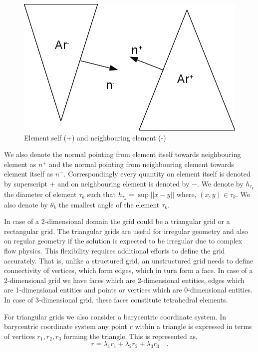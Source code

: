 \documentclass[a4paper]{book}
\begin{document}
\begin{figure}
\centering
  \includegraphics[width=\linewidth]{ch_3_fig_1.jpg}
  \caption{Element self (+) and neighbouring element (-)}
  \label{fig:Self_neighbour}
\end{figure}

We also denote the normal pointing from element itself towards neighbouring element as $n^+$ and the normal pointing from neighbouring element towards element itself as $n^-$. Correspondingly every quantity on element itself is denoted by superscript $+$ and on neighbouring element is denoted by $-$.  We denote by $h_{\tau_k}$ the diameter of element $\tau_k$ such that $h_{\tau_k} = \sup ||x-y||$ where, $(x,y) \in \tau_k$. We also denote by $\theta_k$ the smallest angle of the element $\tau_k$.

In case of a 2-dimensional domain the grid could be a triangular grid or a rectangular grid. The triangular grids are useful for irregular geometry and also on regular geometry if the solution is expected to be irregular due to complex flow physics. This flexibility requires additional efforts to define the grid accurately. That is, unlike a structured grid, an unstructured grid needs to define connectivity of vertices, which form edges, which in turn form a face. In case of a 2-dimensional grid we have faces which are 2-dimensional entities, edges which are 1-dimensional entities and points or vertices which are 0-dimensional entities. In case of 3-dimensional grid, these faces constitute tetrahedral elements. 

For triangular grids we also consider a barycentric coordinate system. In barycentric coordinate system any point $r$ within a triangle is expressed in terms of vertices $r_1,r_2,r_3$ forming the triangle. This is represented as, \begin{equation}\label{barycentric point}
r = \lambda_1 r_1 + \lambda_2 r_2 + \lambda_3 r_3 \quad \textrm{.}
\end{equation}
\end{document}
